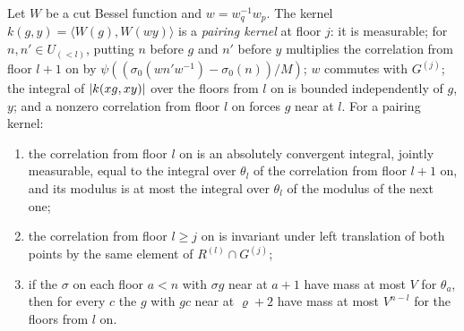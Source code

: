 
\begin{lemma}\label{lem:pairing-kernel}
Let $W$ be a cut Bessel function and $w=w_q^{-1}w_p$. The kernel $k(g,y)=\langle W(g),W(wy)\rangle$ is a \emph{pairing kernel} at floor $j$: it is measurable; for $n,n'\in U_{(<l)}$, putting $n$ before $g$ and $n'$ before $y$ multiplies
the correlation from floor $l+1$ on by $\psi((\sigma_0(wn'w^{-1})-\sigma_0(n))/M)$; $w$ commutes with $G^{(j)}$; the integral of $\lvert k(xg,xy)\rvert$ over the floors from $l$ on is bounded independently of $g$, $y$; and a nonzero
correlation from floor $l$ on forces $g$ near at $l$. For a pairing kernel:
\begin{enumerate}[label=\textup{(\alph*)}]
\item the correlation from floor $l$ on is an absolutely convergent integral, jointly measurable, equal to the integral over $\theta_l$ of the correlation from floor $l+1$ on, and its modulus is at most the integral over
$\theta_l$ of the modulus of the next one;
\item the correlation from floor $l\ge j$ on is invariant under left translation of both points by the same element of $R^{(l)}\cap G^{(j)}$;
\item if the $\sigma$ on each floor $a<n$ with $\sigma g$ near at $a+1$ have mass at most $V$ for $\theta_a$, then for every $c$ the $g$ with $gc$ near at $\varrho+2$ have mass at most $V^{n-l}$ for the floors from $l$ on.
\end{enumerate}
\end{lemma}

